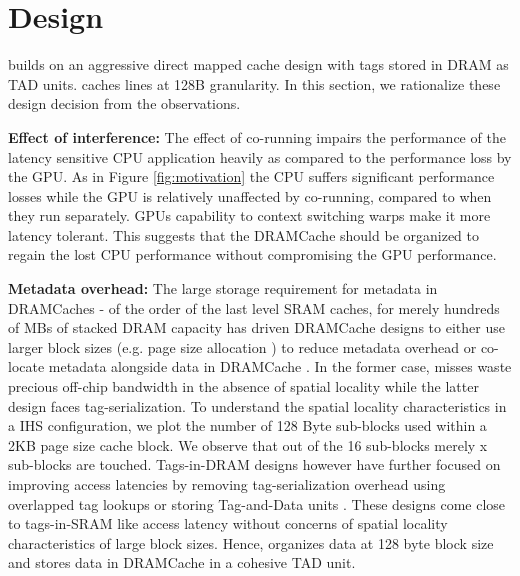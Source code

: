 \section{\cachename Design} \label{design}
\cachename builds on an aggressive direct mapped cache design with tags stored in DRAM as TAD units. \cachename caches lines at 128B granularity. In this section, we rationalize these design decision from the observations.

\par \textbf{Effect of interference:} The effect of co-running impairs the performance of the latency sensitive CPU application heavily as compared to the performance loss by the GPU. As in Figure \ref{fig:motivation} the CPU suffers significant performance losses while the GPU is relatively unaffected by co-running, compared to when they run separately. GPUs capability to context switching warps make it more latency tolerant. This suggests that the DRAMCache should be organized to regain the lost CPU performance without compromising the GPU performance.

\par \textbf{Metadata overhead:} The large storage requirement for metadata in DRAMCaches - of the order of the last level SRAM caches, for merely hundreds of MBs of stacked DRAM capacity has driven DRAMCache designs to either use larger block sizes (e.g. page size allocation \cite{footprint}) to reduce metadata overhead or co-locate metadata alongside data in DRAMCache \cite{loh-hill,alloy,atcache}. In the former case, misses waste precious off-chip bandwidth in the absence of spatial locality while the latter design faces tag-serialization. To understand the spatial locality characteristics in a IHS configuration, we plot the number of 128 Byte sub-blocks used within a 2KB page size cache block. We observe that out of the 16 sub-blocks merely x sub-blocks are touched. Tags-in-DRAM designs however have further focused on improving access latencies by removing tag-serialization overhead using overlapped tag lookups \cite{loh-hill} or storing Tag-and-Data units \cite{alloy}. These designs come close to tags-in-SRAM like access latency without concerns of spatial locality characteristics of large block sizes. Hence, \cachename organizes data at 128 byte block size and stores data in DRAMCache in a cohesive TAD unit.

